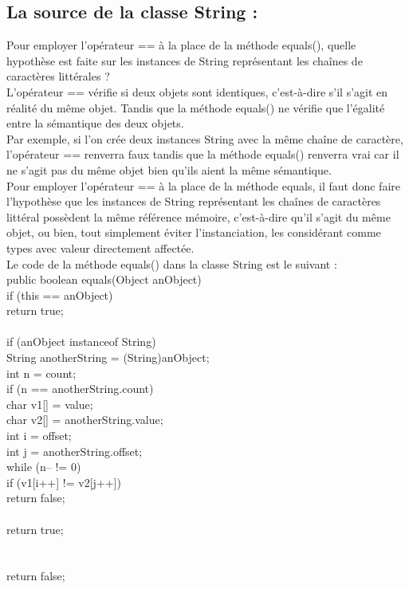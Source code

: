 \documentclass{article}
\begin{document}
\subsection{La source de la classe String : }
Pour employer l’opérateur == à la place de la méthode equals(), quelle hypothèse est faite sur les instances de String représentant les chaînes de caractères littérales ?\\
L’opérateur == vérifie si deux objets sont identiques, c'est-à-dire s’il s’agit en réalité du même objet. Tandis que la méthode equals() ne vérifie que l’égalité entre la sémantique des deux objets.\\
Par exemple, si l’on crée deux instances String avec la même chaîne de caractère,
l’opérateur == renverra faux tandis que la méthode equals() renverra vrai car il ne s’agit pas du même objet bien qu’ils aient la même sémantique.\\
Pour employer l’opérateur == à la place de la méthode equals, il faut donc faire l’hypothèse que les instances de String représentant les chaînes de caractères littéral possèdent la même référence mémoire, c'est-à-dire qu'il s’agit du même objet, ou bien, tout simplement éviter l'instanciation, les considérant comme types avec valeur directement affectée.\\
\newline
Le code de la méthode equals() dans la classe String est le suivant :\\
public boolean equals(Object anObject) {\\
if (this == anObject) {\\
return true;\\
}\\
if (anObject instanceof String) {\\
String anotherString = (String)anObject;\\
int n = count;\\
if (n == anotherString.count) {\\
char v1[] = value;\\
char v2[] = anotherString.value;\\
int i = offset;\\
int j = anotherString.offset;\\
while (n-- != 0) {\\
if (v1[i++] != v2[j++])\\
return false;\\
}\\
return true;\\
}\\
}\\
return false;\\
}\\
\end{document}
